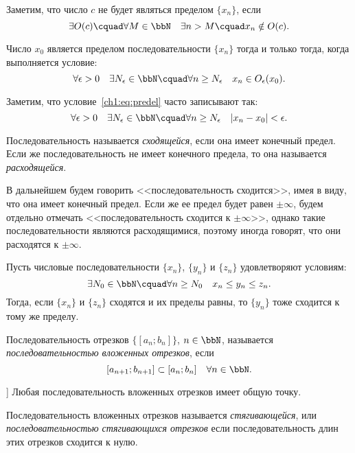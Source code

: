 Заметим, что число $c$ не будет являться пределом $\{x_n\}$, если 
$$
\exists O(c)\cquad \forall M \in \bbN\quad \exists n > M\cquad x_n \notin O(c).
$$
\begin{lemm}
Число $x_0$ является пределом последовательности $\{x_n\}$ тогда и только тогда, когда выполняется условие:
\begin{equation}
\label{ch1:eq:predel}
\forall \epsilon>0\quad \exists N_\epsilon \in \bbN\cquad \forall n \ge N_\epsilon\quad x_n \in O_\epsilon(x_0).
\end{equation}
\end{lemm}
Заметим, что условие~\eqref{ch1:eq:predel} часто записывают так:
$$
\forall \epsilon>0\quad \exists N_\epsilon \in \bbN\cquad \forall n \ge N_\epsilon\quad |x_n-x_0|<\epsilon.
$$
\begin{defn}
Последовательность называется \textit{сходящейся}, если она имеет конечный предел. Если же последовательность не имеет конечного предела, то она называется \textit{расходящейся}.
\end{defn}
В дальнейшем будем говорить <<последовательность сходится>>, имея в виду, что она имеет конечный предел. Если же ее предел будет равен $\pm\infty$, будем отдельно отмечать <<последовательность сходится к $\pm\infty$>>, однако такие последовательности являются расходящимися, поэтому иногда говорят, что они расходятся к $\pm\infty$. 
\begin{thm} \label{ch1:th:otrehposled}  
Пусть числовые последовательности $\{x_n\}$, $\{y_n\}$ и $\{z_n\}$ удовлетворяют условиям:
$$
\exists N_0 \in \bbN\cquad \forall n\ge N_0 \quad x_n \le y_n \le z_n.
$$
Тогда, если $\{x_n\}$ и $\{z_n\}$ сходятся и их пределы равны, то $\{y_n\}$ тоже сходится к тому же пределу.
\end{thm}

\begin{defn}
Последовательность отрезков $\{[a_n;b_n]\}$, $n \in \bbN$, называется \textit{последовательностью вложенных отрезков}, если
$$
[a_{n+1};b_{n+1}]\subset [a_n;b_n]\quad \forall n \in \bbN.
$$
\end{defn}

\begin{thm}]
Любая последовательность вложенных отрезков имеет общую точку.
\end{thm}

\begin{defn}
Последовательность вложенных отрезков называется \textit{стягивающейся}, или \textit{последовательностью стягивающихся отрезков} если последовательность длин этих отрезков сходится к нулю.
\end{defn}

